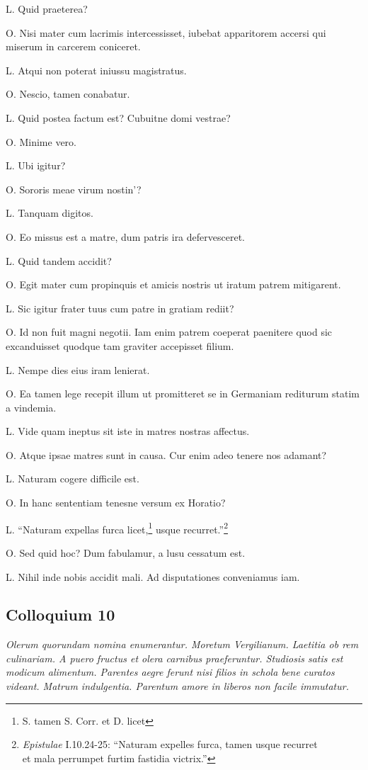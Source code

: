 \documentclass{article}
\begin{document}
L. Quid praeterea?

O. Nisi mater cum lacrimis intercessisset, iubebat apparitorem accersi qui miserum in carcerem coniceret.

L. Atqui non poterat iniussu magistratus.

O. Nescio, tamen conabatur.

L. Quid postea factum est? Cubuitne domi vestrae?

O. Minime vero.

L. Ubi igitur?

O. Sororis meae virum nostin'?

L. Tanquam digitos.

O. Eo missus est a matre, dum patris ira defervesceret.

L. Quid tandem accidit?

O. Egit mater cum propinquis et amicis nostris ut iratum patrem mitigarent.

L. Sic igitur frater tuus cum patre in gratiam rediit?

O. Id non fuit magni negotii. Iam enim patrem coeperat paenitere quod sic excanduisset quodque tam graviter accepisset filium.

L. Nempe dies eius iram lenierat.

O. Ea tamen lege recepit illum ut promitteret se in Germaniam rediturum statim a vindemia.

L. Vide quam ineptus sit iste in matres nostras affectus.

O. Atque ipsae matres sunt in causa. Cur enim adeo tenere nos adamant?

L. Naturam cogere difficile est.

O. In hanc sententiam tenesne versum ex Horatio?

L. ``Naturam expellas furca licet,\footnote{S. tamen S. Corr. et D. licet} usque recurret.''\footnote{\emph{Epistulae} I.10.24-25: ``Naturam expelles furca, tamen usque recurret\\ et mala perrumpet furtim fastidia victrix.''}

O. Sed quid hoc? Dum fabulamur, a lusu cessatum est.

 
L. Nihil inde nobis accidit mali. Ad disputationes conveniamus iam.

 
\subsection{Colloquium 10}
\emph{Olerum quorundam nomina enumerantur. \emph{Moretum} Vergilianum. Laetitia ob rem culinariam. A puero fructus et olera carnibus praeferuntur. Studiosis satis est modicum alimentum. Parentes aegre ferunt nisi filios in schola bene curatos videant. Matrum indulgentia. Parentum amore in liberos non facile immutatur.}
\end{document}
